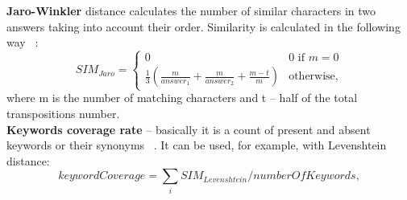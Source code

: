 \textbf{Jaro-Winkler} distance calculates the number of similar characters in two answers taking into account their order. Similarity is calculated in the following way ~\cite{Jaro}:
\begin{equation} \label{eq:Jaro}
SIM_{Jaro} = \begin{cases}
   0 &\text{0 if $m = 0$}\\
   \text{$\frac{1}{3}(\frac{m}{answer_1} + \frac{m}{answer_2} + \frac{m - t}{m})$}&\text{otherwise},
 \end{cases}
\end{equation}
where m is the number of matching characters and t -- half of the total transpositions number.\\

\textbf{Keywords coverage rate} -- basically it is a count of present and absent keywords or their synonyms ~\cite{Li}. It can be used, for example, with Levenshtein distance:
\begin{equation} \label{eq:keywordCover}
keywordCoverage = \sum_{i} SIM_{Levenshtein} / numberOfKeywords,
\end{equation}

